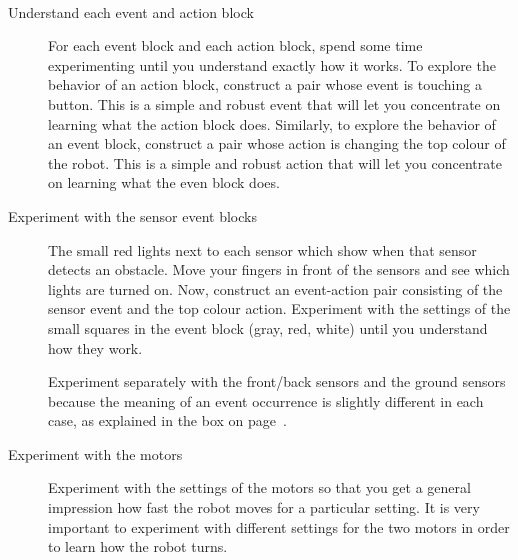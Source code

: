 
\appendix

\label{a.tips}

\
\begin{description}
\item[Understand each event and action block] For each event block and each action block,
spend some time experimenting until you understand exactly how it works.
To explore the behavior of an action block, construct a pair whose
event is touching a button. This is a simple and robust event
that will let you concentrate on learning what the action block does.
Similarly, to explore the behavior of an event block, construct a pair whose
action is changing the top colour of the robot. This is a simple and robust action
that will let you concentrate on learning what the even block does.

\item[Experiment with the sensor event blocks]
The small red lights next to each sensor which show when
that sensor detects an obstacle.
Move your fingers in front of the sensors and see which lights
are turned on. 
Now, construct an event-action pair consisting of the sensor event
and the top colour action. Experiment with the settings of the
small squares in the event block
(gray, red, white) until you understand how they work.

Experiment separately with the front/back sensors and the ground sensors
because the meaning of an event occurrence is slightly different in each case,
as explained in the box on page~\pageref{page.sensors}.

\item[Experiment with the motors]
Experiment with the settings of the motors
so that you get a general impression how fast the robot moves
for a particular setting.
It is very important to experiment with different settings
for the two motors in order to learn how the robot turns.
\end{description}



